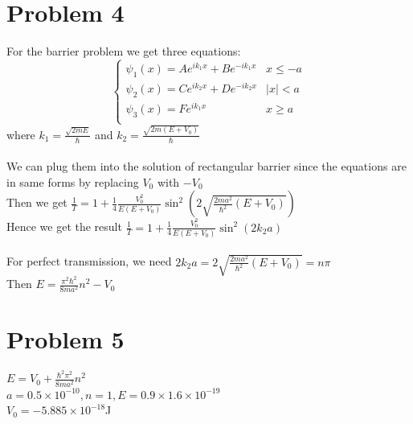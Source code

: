 \documentclass[a4paper]{article}
\begin{document}
\section{Problem 4}
For the barrier problem we get three equations:
\\ \[\left\{\begin{array}{ll}
    \psi_1(x)=Ae^{ik_1x}+Be^{-ik_1x}&x\leq -a\\
    \psi_2(x)=Ce^{ik_2x}+De^{-ik_2x}&|x|<a\\ 
    \psi_3(x)=Fe^{ik_1x}&x\geq a\\  
    \end{array}\right.\]
where $k_1=\frac{\sqrt{2mE}}{\hbar}$ and $k_2=\frac{\sqrt{2m(E+V_0)}}{\hbar}$
\\\\We can plug them into the solution of rectangular barrier since the equations are in same forms by replacing $V_0$ with $-V_0$
\\Then we get $\frac{1}{T}=1+\frac{1}{4}\frac{V_0^2}{E(E+V_0)}\sin^2(2\sqrt{\frac{2ma^2}{\hbar^2}(E+V_0)})$
\\Hence we get the result $\frac{1}{T}=1+\frac{1}{4}\frac{V_0^2}{E(E+V_0)}\sin^2(2k_2a)$
\\\\For perfect transmission, we need $2k_2a=2\sqrt{\frac{2ma^2}{\hbar^2}(E+V_0)}=n\pi$
\\Then $E=\frac{\pi^2\hbar^2}{8ma^2}n^2-V_0$
\section{Problem 5}
\noindent $E=V_0+\frac{\hbar^2\pi^2}{8ma^2}n^2$
\\$a=0.5\times10^{-10},n=1,E=0.9\times1.6\times10^{-19}$
\\$V_0=-5.885\times10^{-18}$J
\end{document}
